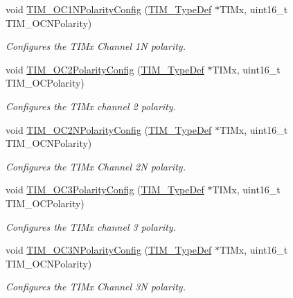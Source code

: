 \begin{DoxyCompactItemize}
void \mbox{\hyperlink{group___t_i_m___private___functions_ga3cb91578e7dd34ea7d09862482960445}{T\+I\+M\+\_\+\+O\+C1\+N\+Polarity\+Config}} (\mbox{\hyperlink{struct_t_i_m___type_def}{T\+I\+M\+\_\+\+Type\+Def}} $\ast$T\+I\+Mx, uint16\+\_\+t T\+I\+M\+\_\+\+O\+C\+N\+Polarity)
\begin{DoxyCompactList}\small\item\em Configures the T\+I\+Mx Channel 1N polarity. \end{DoxyCompactList}\item 
void \mbox{\hyperlink{group___t_i_m___private___functions_ga6831cacaac1ef50291af94db94450797}{T\+I\+M\+\_\+\+O\+C2\+Polarity\+Config}} (\mbox{\hyperlink{struct_t_i_m___type_def}{T\+I\+M\+\_\+\+Type\+Def}} $\ast$T\+I\+Mx, uint16\+\_\+t T\+I\+M\+\_\+\+O\+C\+Polarity)
\begin{DoxyCompactList}\small\item\em Configures the T\+I\+Mx channel 2 polarity. \end{DoxyCompactList}\item 
void \mbox{\hyperlink{group___t_i_m___private___functions_ga2fa6ea3a89f446b52b4e699272b70cad}{T\+I\+M\+\_\+\+O\+C2\+N\+Polarity\+Config}} (\mbox{\hyperlink{struct_t_i_m___type_def}{T\+I\+M\+\_\+\+Type\+Def}} $\ast$T\+I\+Mx, uint16\+\_\+t T\+I\+M\+\_\+\+O\+C\+N\+Polarity)
\begin{DoxyCompactList}\small\item\em Configures the T\+I\+Mx Channel 2N polarity. \end{DoxyCompactList}\item 
void \mbox{\hyperlink{group___t_i_m___private___functions_ga1ef43b03fe666495e80aac9741ae7ab0}{T\+I\+M\+\_\+\+O\+C3\+Polarity\+Config}} (\mbox{\hyperlink{struct_t_i_m___type_def}{T\+I\+M\+\_\+\+Type\+Def}} $\ast$T\+I\+Mx, uint16\+\_\+t T\+I\+M\+\_\+\+O\+C\+Polarity)
\begin{DoxyCompactList}\small\item\em Configures the T\+I\+Mx channel 3 polarity. \end{DoxyCompactList}\item 
void \mbox{\hyperlink{group___t_i_m___private___functions_gac710acc5b682e892584fc6f089f61dc2}{T\+I\+M\+\_\+\+O\+C3\+N\+Polarity\+Config}} (\mbox{\hyperlink{struct_t_i_m___type_def}{T\+I\+M\+\_\+\+Type\+Def}} $\ast$T\+I\+Mx, uint16\+\_\+t T\+I\+M\+\_\+\+O\+C\+N\+Polarity)
\begin{DoxyCompactList}\small\item\em Configures the T\+I\+Mx Channel 3N polarity. \end{DoxyCompactList}\item 

\end{DoxyCompactItemize}
